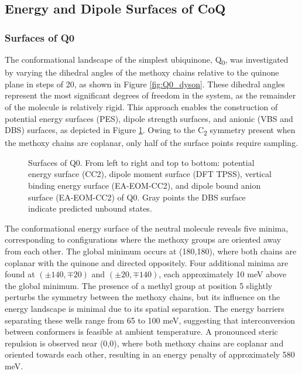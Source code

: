 \subsection{Energy and Dipole Surfaces of CoQ}

\subsubsection{Surfaces of Q0}

The conformational landscape of the simplest ubiquinone, Q\textsubscript{0}, was investigated by varying the dihedral angles of the methoxy chains relative to the quinone plane in steps of 20\degree, as shown in Figure \ref{fig:Q0_dyson}. These dihedral angles represent the most significant degrees of freedom in the system, as the remainder of the molecule is relatively rigid. This approach enables the construction of potential energy surfaces (PES), dipole strength surfaces, and anionic (VBS and DBS) surfaces, as depicted in Figure \ref{fig:Q0_maps}. Owing to the C\textsubscript{2} symmetry present when the methoxy chains are coplanar, only half of the surface points require sampling.

\begin{figure}[hb!]
  \centering
  \small
   
  \caption[Surfaces of Q0]{Surfaces of Q0. From left to right and top to bottom: potential energy surface (CC2), dipole moment surface (DFT TPSS), vertical binding energy surface (EA-EOM-CC2), and dipole bound anion surface (EA-EOM-CC2) of Q0. Gray points the DBS surface indicate predicted unbound states.\label{fig:Q0_maps}}
\end{figure}

The conformational energy surface of the neutral molecule reveals five minima, corresponding to configurations where the methoxy groups are oriented away from each other. The global minimum occurs at (180,180), where both chains are coplanar with the quinone and directed oppositely. Four additional minima are found at $\mathrm{(\pm140,\mp20)}$ and $\mathrm{(\pm20,\mp140)}$, each approximately 10 meV above the global minimum. The presence of a methyl group at position 5 slightly perturbs the symmetry between the methoxy chains, but its influence on the energy landscape is minimal due to its spatial separation. The energy barriers separating these wells range from 65 to 100 meV, suggesting that interconversion between conformers is feasible at ambient temperature. A pronounced steric repulsion is observed near (0,0), where both methoxy chains are coplanar and oriented towards each other, resulting in an energy penalty of approximately 580 meV.

